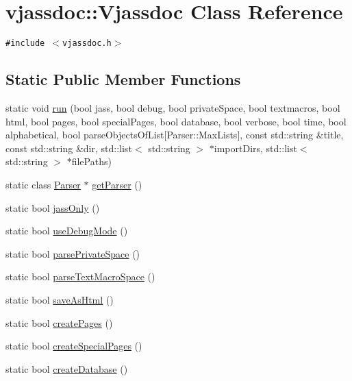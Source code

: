 \hypertarget{classvjassdoc_1_1Vjassdoc}{
\section{vjassdoc::Vjassdoc Class Reference}
\label{classvjassdoc_1_1Vjassdoc}
}
{\tt \#include $<$vjassdoc.h$>$}

\subsection*{Static Public Member Functions}
\begin{CompactItemize}
\item 
static void \hyperlink{classvjassdoc_1_1Vjassdoc_73090a0eeffae1af73d153b881fd5d03}{run} (bool jass, bool debug, bool privateSpace, bool textmacros, bool html, bool pages, bool specialPages, bool database, bool verbose, bool time, bool alphabetical, bool parseObjectsOfList\mbox{[}Parser::MaxLists\mbox{]}, const std::string \&title, const std::string \&dir, std::list$<$ std::string $>$ $\ast$importDirs, std::list$<$ std::string $>$ $\ast$filePaths)
\item 
static class \hyperlink{classvjassdoc_1_1Parser}{Parser} $\ast$ \hyperlink{classvjassdoc_1_1Vjassdoc_b8697267d6b9ad377e05fba7132ca804}{getParser} ()
\item 
static bool \hyperlink{classvjassdoc_1_1Vjassdoc_1fe1b4e1b45efef8687def4cb833f70f}{jassOnly} ()
\item 
static bool \hyperlink{classvjassdoc_1_1Vjassdoc_25d13d1e5ffe741f3f457cce5101739e}{useDebugMode} ()
\item 
static bool \hyperlink{classvjassdoc_1_1Vjassdoc_e4a75f16d2c7258ee5d9ac3c8e049d69}{parsePrivateSpace} ()
\item 
static bool \hyperlink{classvjassdoc_1_1Vjassdoc_3400f429e29c73d57175b5f4f46d3af2}{parseTextMacroSpace} ()
\item 
static bool \hyperlink{classvjassdoc_1_1Vjassdoc_57da4b736dceace2c0db1aafaf6aa315}{saveAsHtml} ()
\item 
static bool \hyperlink{classvjassdoc_1_1Vjassdoc_6b0ac828b1d3214995b915d81fb3f8dd}{createPages} ()
\item 
static bool \hyperlink{classvjassdoc_1_1Vjassdoc_6356b84d6992625cd9100448f90957e0}{createSpecialPages} ()
\item 
static bool \hyperlink{classvjassdoc_1_1Vjassdoc_31b8f8e1823617f4bdbe49ca4dca1f35}{createDatabase} ()
\item 

\end{CompactItemize}
